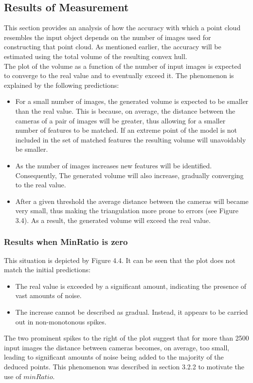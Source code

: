 \documentclass[12pt,a4paper,twoside,openright]{report}
\begin{document}
\subsection{Results of Measurement}
This section provides an analysis of how the accuracy with which a point cloud resembles the input object depends on the number of images used for constructing that point cloud. As mentioned earlier, the accuracy will be estimated using the total volume of the resulting convex hull.\\
The plot of the volume as a function of the number of input images is expected to converge to the real value and to eventually exceed it. The phenomenon is explained by the following predictions:
\begin{itemize}
\item For a small number of images, the generated volume is expected to be smaller than the real value. This is because, on average, the distance between the cameras of a pair of images will be greater, thus allowing for a smaller number of features to be matched. If an extreme point of the model is not included in the set of matched features the resulting volume will unavoidably be smaller.
\item As the number of images increases new features will be identified. Consequently, The generated volume will also increase, gradually converging to the real value.
\item After a given threshold the average distance between the cameras will became very small, thus making the triangulation more prone to errors (see Figure 3.4). As a result, the generated volume will exceed the real value.  
\end{itemize} 

\subsubsection{Results when MinRatio is zero}
This situation is depicted by Figure 4.4. It can be seen that the plot does not match the initial predictions: 
\begin{itemize}
\item The real value is exceeded by a significant amount, indicating the presence of vast amounts of noise. 
\item The increase cannot be described as gradual. Instead, it appears to be carried out in non-monotonous spikes.  
\end{itemize}
The two prominent spikes to the right of the plot suggest that for more than 2500 input images the distance between cameras becomes, on average, too small, leading to significant amounts of noise being added to the majority of the deduced points. This phenomenon was described in section 3.2.2 to motivate the use of $minRatio$. 
\end{document}
